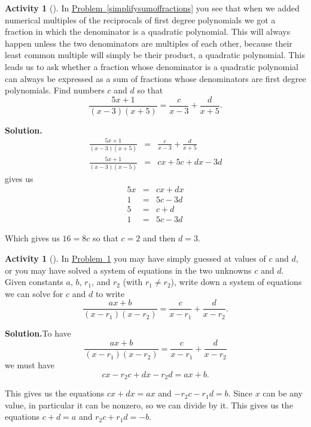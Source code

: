 \documentclass[10pt,]{book}
\theoremstyle{plain}
\theoremstyle{definition}
\newtheorem{activity}[project]{Activity}
\numberwithin{equation}{chapter}
\newcommand{\amp}{&}
\begin{document}
\begin{activity}[]\label{partialfractionsintro}
In \hyperref[simplifysumoffractions]{Problem~\ref{simplifysumoffractions}} you see that when we added numerical multiples of the reciprocals of first degree polynomials we got a fraction in which the denominator is a quadratic polynomial. This will always happen unless the two denominators are multiples of each other, because their least common multiple will simply be their product, a quadratic polynomial. This leads us to ask whether a fraction whose denominator is a quadratic polynomial can always be expressed as a sum of fractions whose denominators are first degree polynomials. Find numbers \(c\) and \(d\) so that%
\begin{equation*}
\frac{5x+1}{(x-3)(x+5)} = \frac{c}{x-3} + \frac{d}{x+5}.
\end{equation*}
%
\par\medskip\noindent%
\textbf{Solution.}\quad %
\begin{align*}
\frac{5x+1}{(x-3)(x+5)} \amp =\amp  \frac{c}{x-3} + \frac{d}{x+5}\\
\frac{5x+1}{(x-3)(x-5)} \amp =\amp cx+5c+dx-3d
\end{align*}
gives us%
\begin{align*}
5x\amp =\amp cx+dx\\
1\amp =\amp 5c-3d\\
5\amp =\amp c+d\\
1\amp =\amp 5c-3d
\end{align*}
%
\par
Which gives us \(16=8c\) so that \(c=2\) and then \(d=3\).%
\end{activity}
\begin{activity}[]\label{partialfractions1}
In \hyperref[partialfractionsintro]{Problem~\ref{partialfractionsintro}} you may have simply guessed at values of \(c\) and \(d\), or you may have solved a system of equations in the two unknowns \(c\) and \(d\). Given constants \(a\), \(b\), \(r_1\), and \(r_2\) (with \(r_1\not= r_2\)), write down a system of equations we can solve for \(c\) and \(d\) to write%
\begin{equation*}
\frac{ax+b}{(x-r_1)(x-r_2)} = \frac{c}{x-r_1} + \frac{d}{x-r_2}.
\end{equation*}
%
\par\medskip\noindent%
\textbf{Solution.}\quad To have%
\begin{equation*}
\frac{ax+b}{(x-r_1)(x-r_2)} =  \frac{c}{x-r_1} + \frac{d}{x-r_2}
\end{equation*}
we must have%
\begin{equation*}
cx-r_2c+dx-r_2d = ax+b.
\end{equation*}
%
\par
This gives us the equations \(cx+dx=ax\) and \(-r_2c-r_1d=b\). Since \(x\) can be any value, in particular it can be nonzero, so we can divide by it. This gives us the equations \(c+d=a\) and \(r_2c+r_1d=-b\).%
\end{activity}
\end{document}
